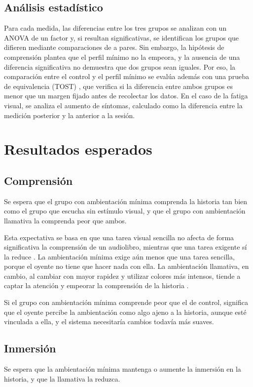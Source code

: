 \documentclass[journal]{IEEEtran}
\begin{document}
\subsection{Análisis estadístico}
Para cada medida, las diferencias entre los tres grupos se analizan con un ANOVA de un factor y, si resultan significativas, se identifican los grupos que difieren mediante comparaciones de a pares. Sin embargo, la hipótesis de comprensión plantea que el perfil mínimo no la empeora, y la ausencia de una diferencia significativa no demuestra que dos grupos sean iguales. Por eso, la comparación entre el control y el perfil mínimo se evalúa además con una prueba de equivalencia (TOST) \cite{lakens2017}, que verifica si la diferencia entre ambos grupos es menor que un margen fijado antes de recolectar los datos. En el caso de la fatiga visual, se analiza el aumento de síntomas, calculado como la diferencia entre la medición posterior y la anterior a la sesión.
 
\section{Resultados esperados}
 
\subsection{Comprensión}
Se espera que el grupo con ambientación mínima comprenda la historia tan bien como el grupo que escucha sin estímulo visual, y que el grupo con ambientación llamativa la comprenda peor que ambos.
 
Esta expectativa se basa en que una tarea visual sencilla no afecta de forma significativa la comprensión de un audiolibro, mientras que una tarea exigente sí la reduce \cite{xie2023}. La ambientación mínima exige aún menos que una tarea sencilla, porque el oyente no tiene que hacer nada con ella. La ambientación llamativa, en cambio, al cambiar con mayor rapidez y utilizar colores más intensos, tiende a captar la atención y empeorar la comprensión de la historia \cite{mayermoreno2003}.
 
Si el grupo con ambientación mínima comprende peor que el de control, significa que el oyente percibe la ambientación como algo ajeno a la historia, aunque esté vinculada a ella, y el sistema necesitaría cambios todavía más suaves.
 
\subsection{Inmersión}
Se espera que la ambientación mínima mantenga o aumente la inmersión en la historia, y que la llamativa la reduzca.
 
\end{document}
